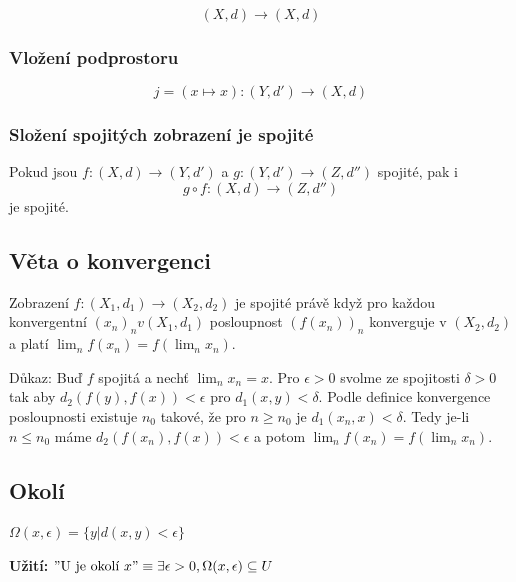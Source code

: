 \documentclass[10pt]{article}
\begin{document}
\[ (X,d) \to (X,d) \]

\subsubsection{Vložení podprostoru}

\[ j = (x \mapsto x): (Y,d') \to (X,d) \]

\subsubsection{Složení spojitých zobrazení je spojité}

Pokud jsou $f: (X,d) \to (Y, d')$ a $g: (Y,d') \to (Z, d'')$ spojité, pak i
\[ g \circ f: (X,d) \to (Z,d'') \] je spojité.

\subsection{Věta o konvergenci}
\hspace{1.2mm}
Zobrazení $f: (X_1,d_1) \rightarrow (X_2,d_2)$ je spojité právě když pro každou konvergentní $(x_n)_n v (X_1,d_1)$ 
posloupnost $(f(x_n))_n$ konverguje v $(X_2,d_2)$ a platí $\lim_n f(x_n) = f(\lim_n x_n)$.

Důkaz:
Buď $f$ spojitá a nechť $\lim_nx_n = x$. Pro $\epsilon > 0$ svolme ze spojitosti $\delta > 0$
tak aby $d_2(f(y),f(x)) <\epsilon$ pro $d_1(x,y) < \delta$.
Podle definice konvergence posloupnosti existuje $n_0$ takové, že pro $n\geq n_0$ je $d_1(x_n,x) < \delta$. Tedy je-li $n \leq n_0$
máme $d_2(f(x_n),f(x)) < \epsilon$ a potom $\lim_n f(x_n) = f(\lim_n x_n)$.
\noindent


\subsection{Okolí}
\hspace{1.2mm}
\noindent
$\Omega (x,\epsilon) = \{ y | d(x,y) < \epsilon \}$

\vspace{5mm}

\textbf{Užití:}
$"\textrm{U je okolí } x" \equiv \exists \epsilon > 0, \Omega (x,\epsilon) \subseteq U $

\end{document}
